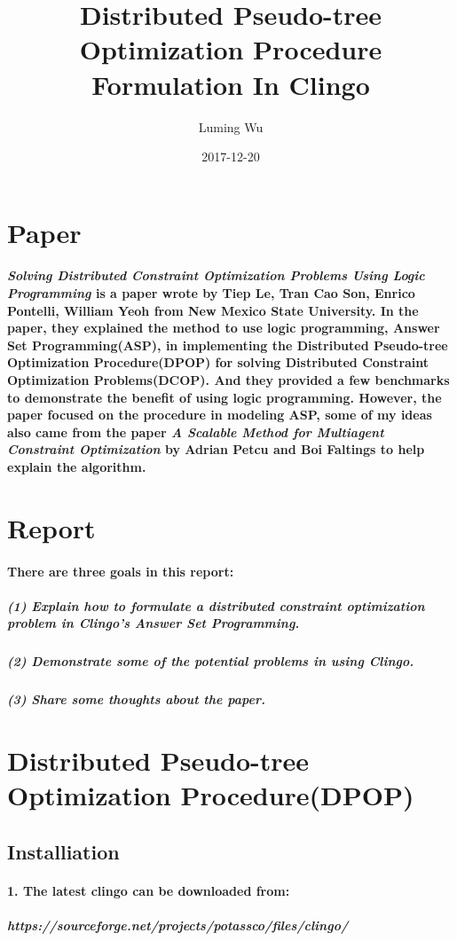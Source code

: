 \documentclass{article}
\title{Distributed Pseudo-tree Optimization Procedure Formulation In Clingo}
\date{2017-12-20}
\author{Luming Wu}
\begin{document}
	\maketitle
	\newpage
	
	\section{Paper}
	\paragraph{\textit{Solving Distributed Constraint Optimization Problems Using Logic Programming} is a paper wrote by Tiep Le, Tran Cao Son, Enrico Pontelli, William Yeoh from New Mexico State University. In the paper, they explained the method to use logic programming, Answer Set Programming(ASP), in implementing the Distributed Pseudo-tree Optimization Procedure(DPOP) for solving Distributed Constraint Optimization Problems(DCOP). And they provided a few benchmarks to demonstrate the benefit of using logic programming. However, the paper focused on the procedure in modeling ASP, some of my ideas also came from the paper \textit{A Scalable Method for Multiagent Constraint Optimization} by Adrian Petcu and Boi Faltings to help explain the algorithm.}
	
	\section{Report}
	\paragraph{There are three goals in this report:}
	\subparagraph{(1) Explain how to formulate a distributed constraint optimization problem in Clingo's Answer Set Programming.}
	\subparagraph{(2) Demonstrate some of the potential problems in using Clingo.}
	\subparagraph{(3) Share some thoughts about the paper.}
	
	\section{Distributed Pseudo-tree Optimization Procedure(DPOP)}
	\subsection{Installiation}
	\paragraph{1. The latest clingo can be downloaded from:}
	\subparagraph{https://sourceforge.net/projects/potassco/files/clingo/}
\end{document}
